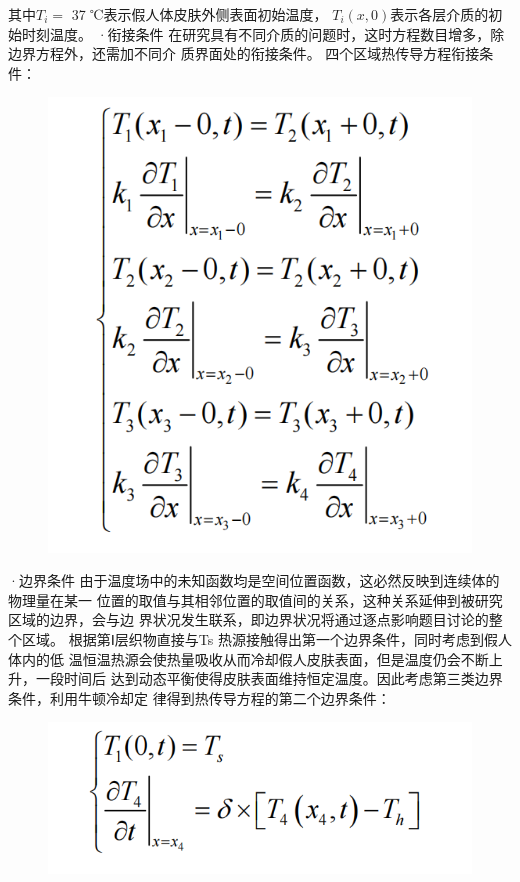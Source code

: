 \documentclass{article}
\begin{document}
	其中$T_{i}=$ 37 ℃表示假人体皮肤外侧表面初始温度， $T_{i}(x,0)$表示各层介质的初始时刻温度。
	·衔接条件 
	在研究具有不同介质的问题时，这时方程数目增多，除边界方程外，还需加不同介
	质界面处的衔接条件。 
	四个区域热传导方程衔接条件：
	
	\begin{figure}[htbp]
		\centering
		\includegraphics[scale=0.4]{屏幕截图 2024-07-15 222911.png}
	\end{figure}
	
	·边界条件 
	由于温度场中的未知函数均是空间位置函数，这必然反映到连续体的物理量在某一
	位置的取值与其相邻位置的取值间的关系，这种关系延伸到被研究区域的边界，会与边
	界状况发生联系，即边界状况将通过逐点影响题目讨论的整个区域。 
	根据第Ⅰ层织物直接与Ts 热源接触得出第一个边界条件，同时考虑到假人体内的低
	温恒温热源会使热量吸收从而冷却假人皮肤表面，但是温度仍会不断上升，一段时间后
	达到动态平衡使得皮肤表面维持恒定温度。因此考虑第三类边界条件，利用牛顿冷却定
	律得到热传导方程的第二个边界条件：
	
	\begin{figure}[htbp]
		\centering
		\includegraphics[scale=0.4]{屏幕截图 2024-07-15 222916.png}
	\end{figure}
	
\end{document}
